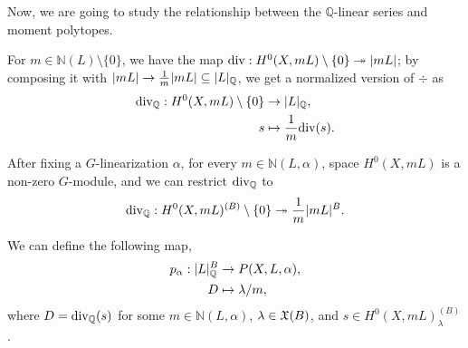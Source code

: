 

Now, we are going to study the relationship between the $\mathbb{Q}$-linear series and moment polytopes.

For $m \in \mathbb{N}(L) \setminus \{0\}$, we have the map $\mathrm{div} : H^0(X, m L) \setminus \{0\} \twoheadrightarrow \mathopen{}\left|m L\right|\mathclose{}$; by composing it with $\ls{m L} \to {1 \over m} \ls{m L} \subseteq \Qls{L}$, we get a normalized version of $\div$ as
\begin{equation}
\begin{aligned}
	\divQ : H^0(X, m L) \setminus \{0\} &\to \Qls{L} , \\
	s &\mapsto {1 \over m} \div(s) .
\end{aligned}
\end{equation}

After fixing a $G$-linearization $\alpha$, for every $m \in \mathbb{N}(L, \alpha)$, space $H^0(X, m L)$ is a non-zero $G$-module, and we can restrict $\mathrm{div}_\mathbb{Q}$ to
\begin{equation*}
	\divQ: H^0(X, m L)^{(B)} \setminus \{0\} \surj {1 \over m} \ls{m L}^B .
\end{equation*}


We can define the following map,
\begin{equation}
\begin{aligned}
	p_\alpha: \mathopen{}\left|L\right|\mathclose{}_\mathbb{Q}^B &\to P(X, L, \alpha), \\
	D &\mapsto \lambda / m,
\end{aligned}
\end{equation}
where $D = \mathrm{div}_\mathbb{Q}(s)$ for some $m \in \mathbb{N}(L, \alpha)$, $\lambda \in \mathfrak{X}(B)$, and $s \in H^0(X, m L)^{(B)}_\lambda$.

